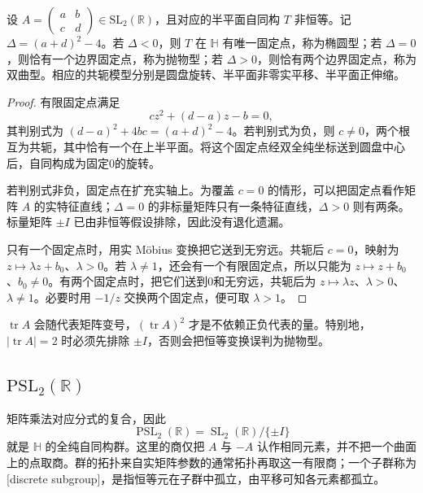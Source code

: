 \begin{proposition}[不动点分类]\label{b3:prop:11-mobius-types}
设 \(A=\left(\begin{smallmatrix}a&b\\c&d\end{smallmatrix}\right)\in\mathrm{SL}_2(\mathbb R)\)，且对应的半平面自同构 \(T\) 非恒等。记 \(\Delta=(a+d)^2-4\)。若 \(\Delta<0\)，则 \(T\) 在 \(\mathbb H\) 有唯一固定点，称为椭圆型；若 \(\Delta=0\)，则恰有一个边界固定点，称为抛物型；若 \(\Delta>0\)，则恰有两个边界固定点，称为双曲型。相应的共轭模型分别是圆盘旋转、半平面非零实平移、半平面正伸缩。
\end{proposition}
\begin{proof}
有限固定点满足
\[
 cz^2+(d-a)z-b=0,
\]
其判别式为 \((d-a)^2+4bc=(a+d)^2-4\)。若判别式为负，则 \(c\ne0\)，两个根互为共轭，其中恰有一个在上半平面。将这个固定点经双全纯坐标送到圆盘中心后，自同构成为固定0的旋转。

若判别式非负，固定点在扩充实轴上。为覆盖 \(c=0\) 的情形，可以把固定点看作矩阵 \(A\) 的实特征直线；\(\Delta=0\) 的非标量矩阵只有一条特征直线，\(\Delta>0\) 则有两条。标量矩阵 \(\pm I\) 已由非恒等假设排除，因此没有退化遗漏。

只有一个固定点时，用实 Möbius 变换把它送到无穷远。共轭后 \(c=0\)，映射为 \(z\mapsto\lambda z+b_0\)、\(\lambda>0\)。若 \(\lambda\ne1\)，还会有一个有限固定点，所以只能为 \(z\mapsto z+b_0\)、\(b_0\ne0\)。有两个固定点时，把它们送到0和无穷远，共轭后为 \(z\mapsto\lambda z\)、\(\lambda>0\)、\(\lambda\ne1\)。必要时用 \(-1/z\) 交换两个固定点，便可取 \(\lambda>1\)。
\end{proof}
\(\operatorname{tr}A\) 会随代表矩阵变号，\((\operatorname{tr}A)^2\) 才是不依赖正负代表的量。特别地，\(|\operatorname{tr}A|=2\) 时必须先排除 \(\pm I\)，否则会把恒等变换误判为抛物型。

\subsection{\texorpdfstring{\(\mathrm{PSL}_2(\mathbb R)\)}{PSL2(R)}}
\label{b3:subsec:110403}

矩阵乘法对应分式的复合，因此
\[
 \operatorname{PSL}_2(\mathbb R)
 =\operatorname{SL}_2(\mathbb R)/\{\pm I\}
\]
就是 \(\mathbb H\) 的全纯自同构群。这里的商仅把 \(A\) 与 \(-A\) 认作相同元素，并不把一个曲面上的点取商。群的拓扑来自实矩阵参数的通常拓扑再取这一有限商；一个子群称为[discrete subgroup]，是指恒等元在子群中孤立，由平移可知各元素都孤立。

